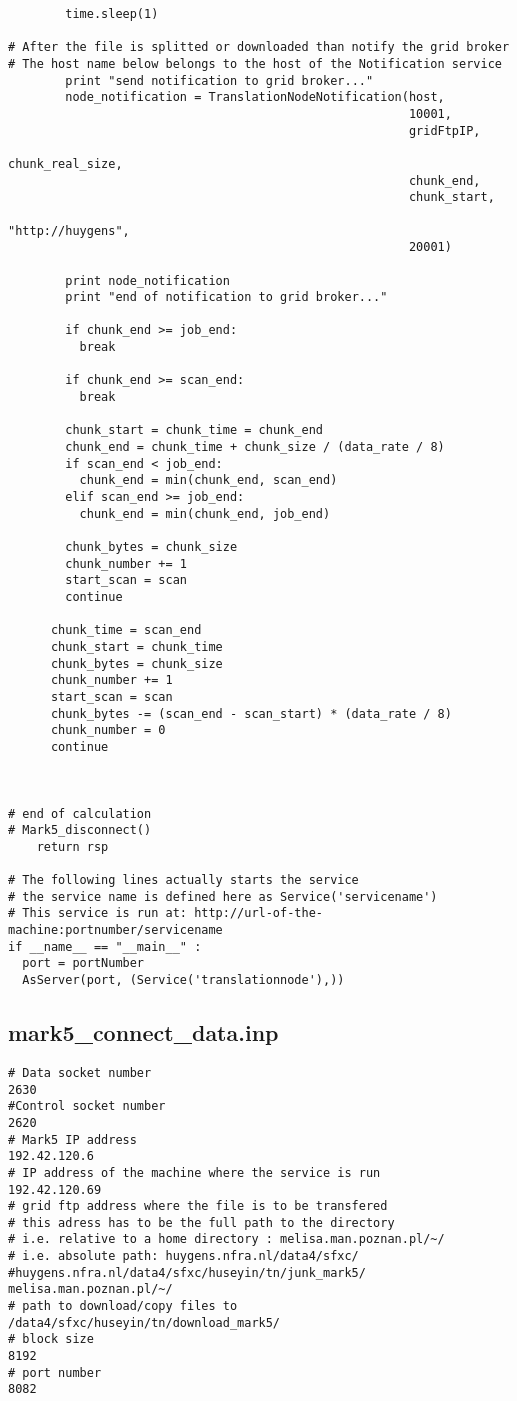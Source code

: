 \begin{verbatim}
        time.sleep(1)

# After the file is splitted or downloaded than notify the grid broker
# The host name below belongs to the host of the Notification service
        print "send notification to grid broker..."
        node_notification = TranslationNodeNotification(host,
                                                        10001,
                                                        gridFtpIP,
                                                        chunk_real_size,
                                                        chunk_end,
                                                        chunk_start,
                                                        "http://huygens",
                                                        20001)

        print node_notification
        print "end of notification to grid broker..."

        if chunk_end >= job_end:
          break

        if chunk_end >= scan_end:
          break

        chunk_start = chunk_time = chunk_end
        chunk_end = chunk_time + chunk_size / (data_rate / 8)
        if scan_end < job_end:
          chunk_end = min(chunk_end, scan_end)
        elif scan_end >= job_end:
          chunk_end = min(chunk_end, job_end)

        chunk_bytes = chunk_size
        chunk_number += 1
        start_scan = scan
        continue

      chunk_time = scan_end
      chunk_start = chunk_time
      chunk_bytes = chunk_size
      chunk_number += 1
      start_scan = scan
      chunk_bytes -= (scan_end - scan_start) * (data_rate / 8)
      chunk_number = 0
      continue



# end of calculation
# Mark5_disconnect()
    return rsp

# The following lines actually starts the service
# the service name is defined here as Service('servicename')
# This service is run at: http://url-of-the-machine:portnumber/servicename
if __name__ == "__main__" :
  port = portNumber
  AsServer(port, (Service('translationnode'),))
\end{verbatim} 

\subsection{mark5\_connect\_data.inp}
\begin{verbatim}
# Data socket number
2630
#Control socket number
2620
# Mark5 IP address
192.42.120.6
# IP address of the machine where the service is run
192.42.120.69
# grid ftp address where the file is to be transfered
# this adress has to be the full path to the directory
# i.e. relative to a home directory : melisa.man.poznan.pl/~/
# i.e. absolute path: huygens.nfra.nl/data4/sfxc/
#huygens.nfra.nl/data4/sfxc/huseyin/tn/junk_mark5/
melisa.man.poznan.pl/~/
# path to download/copy files to
/data4/sfxc/huseyin/tn/download_mark5/
# block size
8192
# port number
8082
\end{verbatim} 

